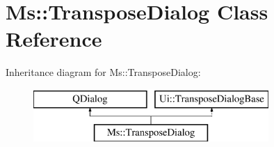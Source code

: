 \hypertarget{class_ms_1_1_transpose_dialog}{}\section{Ms\+:\+:Transpose\+Dialog Class Reference}
\label{class_ms_1_1_transpose_dialog}
Inheritance diagram for Ms\+:\+:Transpose\+Dialog\+:\begin{figure}[H]
\begin{center}
\leavevmode
\includegraphics[height=2.000000cm]{class_ms_1_1_transpose_dialog}
\end{center}
\end{figure}
